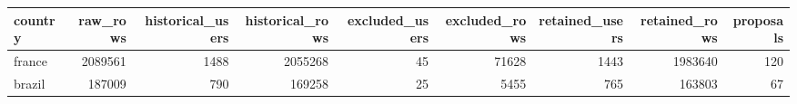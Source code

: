 \begin{tabular}{lrrrrrrrr}
\toprule
country & raw_rows & historical_users & historical_rows & excluded_users & excluded_rows & retained_users & retained_rows & proposals \\
\midrule
france & 2089561 & 1488 & 2055268 & 45 & 71628 & 1443 & 1983640 & 120 \\
brazil & 187009 & 790 & 169258 & 25 & 5455 & 765 & 163803 & 67 \\
\bottomrule
\end{tabular}
